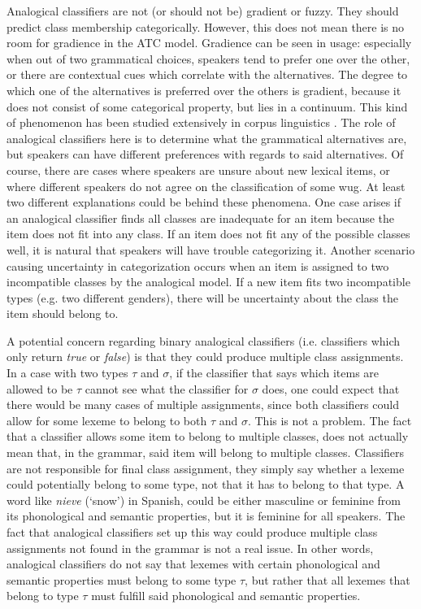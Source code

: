 Analogical classifiers are not (or should not be) gradient or fuzzy. They should predict class membership categorically. However, this does not mean there is no room for gradience in the ATC model. Gradience can be seen in usage: especially when out of two grammatical choices, speakers tend to prefer one over the other, or there are contextual cues which correlate with the alternatives. The degree to which one of the alternatives is preferred over the others is gradient, because it does not consist of some categorical property, but lies in a continuum. This kind of phenomenon has been studied extensively in corpus linguistics \autocites{Bresnan.2007, Bresnan.2008, Francis.2014, Hay.2006, Kapatsinski.2012}. The role of analogical classifiers here is to determine what the grammatical alternatives are, but speakers can have different preferences with regards to said alternatives. Of course, there are cases where speakers are unsure about new lexical items, or where different speakers do not agree on the classification of some wug. At least two different explanations could be behind these phenomena. One case arises if an analogical classifier finds all classes are inadequate for an item because the item does not fit into any class. If an item does not fit any of the possible classes well, it is natural that speakers will have trouble categorizing it. Another scenario causing uncertainty in categorization occurs when an item is assigned to two incompatible classes by the analogical model. If a new item fits two incompatible types (e.g. two different genders), there will be uncertainty about the class the item should belong to.

A potential concern regarding binary analogical classifiers (i.e. classifiers which only return \textit{true} or \textit{false}) is that they could produce multiple class assignments. In a case with two types $\tau$ and $\sigma$, if the classifier that says which items are allowed to be $\tau$ cannot see what the classifier for $\sigma$ does, one could expect that there would be many cases of multiple assignments, since both classifiers could allow for some lexeme to belong to both $\tau$ and $\sigma$. This is not a problem. The fact that a classifier allows some item to belong to multiple classes, does not actually mean that, in the grammar, said item will belong to multiple classes. Classifiers are not responsible for final class assignment, they simply say whether a lexeme could potentially belong to some type, not that it has to belong to that type. A word like \textit{nieve} (`snow') in Spanish, could be either masculine or feminine from its phonological and semantic properties, but it is feminine for all speakers. The fact that analogical classifiers set up this way could produce multiple class assignments not found in the grammar is not a real issue. In other words, analogical classifiers do not say that lexemes with certain phonological and semantic properties must belong to some type $\tau$, but rather that all lexemes that belong to type $\tau$ must fulfill said phonological and semantic properties.

